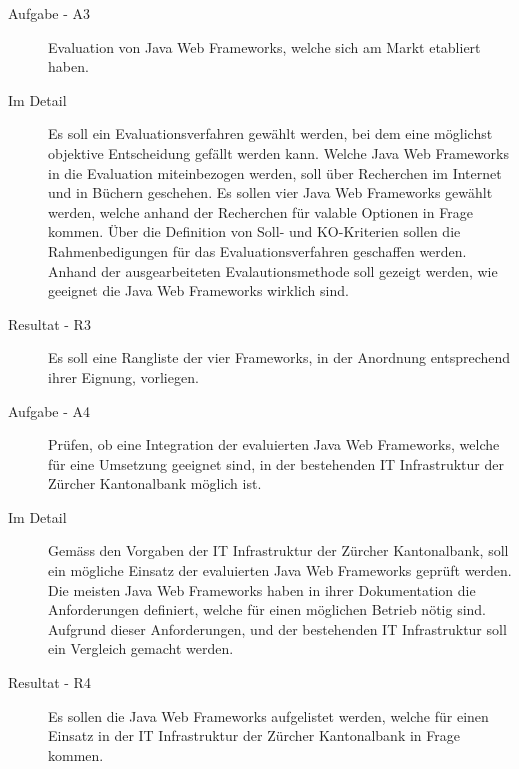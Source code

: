   \begin{description}
    \item[Aufgabe - A3\label{itm:Aufgabe-03}]
    \begin{itshape}Evaluation von Java Web Frameworks, welche sich am Markt
    etabliert haben.\end{itshape}
    \item[Im Detail\label{itm:Detail-03}]
    Es soll ein Evaluationsverfahren gewählt werden, bei dem eine möglichst
    objektive Entscheidung gefällt werden kann. Welche Java Web Frameworks in
    die Evaluation miteinbezogen werden, soll über Recherchen im Internet und in
    Büchern geschehen. Es sollen vier Java Web Frameworks gewählt werden, welche
    anhand der Recherchen für valable Optionen in Frage kommen. Über die
    Definition von Soll- und KO-Kriterien sollen die Rahmenbedigungen für das
    Evaluationsverfahren geschaffen werden. Anhand der ausgearbeiteten
    Evalautionsmethode soll gezeigt werden, wie geeignet die Java Web Frameworks
    wirklich sind.
    \item[Resultat - R3\label{itm:Resultat-03}]
    Es soll eine Rangliste der vier Frameworks, in der Anordnung entsprechend
    ihrer Eignung, vorliegen.
  \end{description}
  
  \begin{description}
    \item[Aufgabe - A4\label{itm:Aufgabe-04}]
    \begin{itshape}Prüfen, ob eine Integration der evaluierten Java Web
    Frameworks, welche für eine Umsetzung geeignet sind, in der bestehenden IT
    Infrastruktur der Zürcher Kantonalbank möglich ist.\end{itshape}
    \item[Im Detail\label{itm:Detail-04}]
    Gemäss den Vorgaben der IT Infrastruktur der Zürcher Kantonalbank, soll ein
    mögliche Einsatz der evaluierten Java Web Frameworks geprüft werden. Die
    meisten Java Web Frameworks haben in ihrer Dokumentation die Anforderungen
    definiert, welche für einen möglichen Betrieb nötig sind. Aufgrund dieser
    Anforderungen, und der bestehenden IT Infrastruktur soll ein Vergleich
    gemacht werden.
    \item[Resultat - R4\label{itm:Resultat-04}]
    Es sollen die Java Web Frameworks aufgelistet werden, welche für einen
    Einsatz in der IT Infrastruktur der Zürcher Kantonalbank in Frage kommen.
  \end{description}
  
